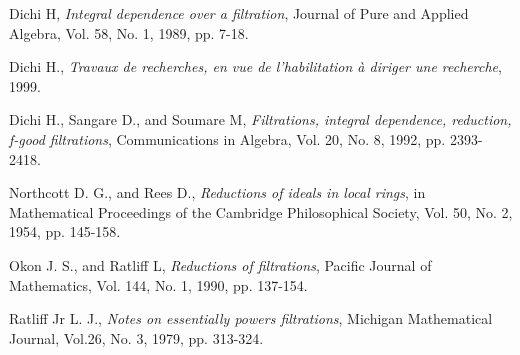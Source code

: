 \begin{thebibliography}{99}
	
	
	 Dichi H,\textit{ Integral dependence over a filtration}, Journal of Pure and Applied Algebra, Vol. 58, No. 1, 1989, pp. 7-18. 
	
	 Dichi H., \textit{Travaux de recherches, en vue de l'habilitation à diriger une recherche}, 1999.	
	
	 Dichi H., Sangare D., and Soumare M,\textit{ Filtrations, integral dependence, reduction, f-good filtrations}, Communications in Algebra, Vol. 20, No. 8, 1992, pp. 2393-2418.
	
	 Northcott D. G., and Rees D.,\textit{ Reductions of ideals in local rings}, in Mathematical Proceedings of the Cambridge Philosophical Society, Vol. 50, No. 2, 1954, pp. 145-158.
	
	 Okon J. S., and Ratliff L,\textit{ Reductions of filtrations}, Pacific Journal of Mathematics, Vol. 144, No. 1, 1990, pp. 137-154.
	
	 Ratliff Jr L. J.,\textit{ Notes on essentially powers filtrations}, Michigan Mathematical Journal, Vol.26, No. 3, 1979, pp. 313-324.

\end{thebibliography}
